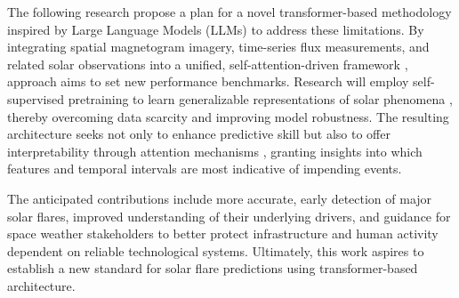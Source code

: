 \documentclass[12pt,a4paper,oneside]{report}
\begin{document}
The following research propose a plan for a novel transformer-based methodology inspired by Large Language Models (LLMs) \cite{RefWorks:RefID:3-vaswani2023provided,RefWorks:RefID:2-abduallah2023operational} to address these limitations. By integrating spatial magnetogram imagery, time-series flux measurements, and related solar observations into a unified, self-attention-driven framework \cite{RefWorks:RefID:35-licllmate:}, approach aims to set new performance benchmarks. Research will employ self-supervised pretraining to learn generalizable representations of solar phenomena \cite{RefWorks:RefID:29-hoffmanntraining}, thereby overcoming data scarcity and improving model robustness. The resulting architecture seeks not only to enhance predictive skill but also to offer interpretability through attention mechanisms \cite{RefWorks:RefID:17-devlinbert:}, granting insights into which features and temporal intervals are most indicative of impending events.

The anticipated contributions include more accurate, early detection of major solar flares, improved understanding of their underlying drivers, and guidance for space weather stakeholders to better protect infrastructure and human activity dependent on reliable technological systems. Ultimately, this work aspires to establish a new standard for solar flare predictions using transformer-based architecture.
\noindent

\clearpage
\tableofcontents


\end{document}
